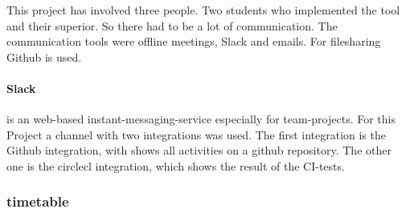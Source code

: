 This project has involved three people. Two students who implemented the tool and their superior. So there had to be a lot of communication. The communication tools were offline meetings, Slack and emails. For filesharing Github is used. 

\paragraph*{Slack} is an web-based instant-messaging-service especially for team-projects. For this Project a channel with two integrations was used. The first integration is the Github integration, with shows all activities on a github repository. The other one is the circlecl integration, which shows the result of the CI-tests. 

\subsubsection*{timetable}



